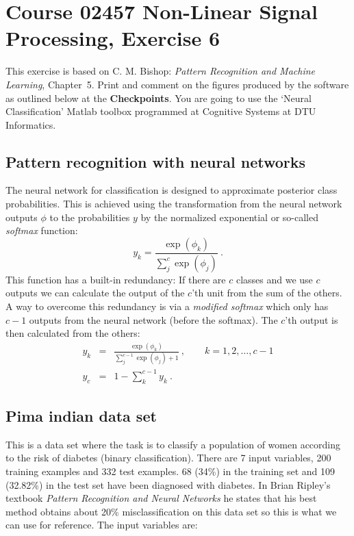 \documentclass[12pt]{article}    %
\begin{document}
\section*{Course 02457 Non-Linear Signal
  Processing, Exercise 6}

This exercise is based on C. M. Bishop: {\em Pattern Recognition
and Machine Learning}, Chapter~5. Print and comment on the figures
produced by the software as outlined below at the {\bf
Checkpoints}. You are going to use the `Neural Classification'
Matlab toolbox programmed at Cognitive Systems at DTU Informatics.

\subsection*{Pattern recognition with neural networks}

The neural network for classification is designed to approximate posterior class probabilities.
This is achieved using the
transformation from the neural network
outputs $\phi$ to the probabilities $y$ by the normalized exponential
or so-called {\em softmax} function:
\begin{equation}
  \label{eq:softmax}
  y_k = \frac{\exp(\phi_k)}{\sum^{c}_j \exp(\phi_j)} \ .
\end{equation}
This function has a built-in redundancy:
If there are $c$ classes and we use $c$ outputs we can calculate the
output of the $c$'th unit from the sum of the others.
A way to overcome this redundancy is via a {\em modified softmax}
which only has $c-1$ outputs from the neural network (before the
softmax). The $c$'th output is then calculated from the others:
\begin{eqnarray}
  \label{eq:modsoftmax}
  y_k &=& \frac{\exp(\phi_k)}{\sum^{c-1}_j \exp (\phi_j) + 1} \ ,
  \qquad k = 1,2, \ldots, c-1 \\
  y_c &=& 1- \sum^{c-1}_k y_k \ .
\end{eqnarray}


\subsection*{Pima indian data set}

This is a data set where the task is to classify a
population of women according to the risk of diabetes (binary classification).
There are 7 input variables, 200 training examples and 332 test
examples. 68 (34\%) in the training set and 109 (32.82\%) in the test
set have been diagnosed with diabetes.
In Brian Ripley's textbook {\em Pattern Recognition and Neural Networks} he
states that his best method obtains about 20\% misclassification on this data set so this
is what we can use for reference.
The input variables are:
\end{document}

